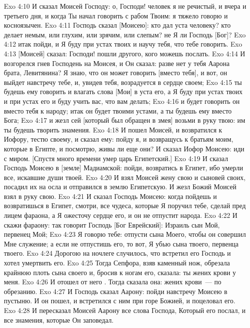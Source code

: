 \rsbpar\vs Exo 4:10 И сказал Моисей Господу: о, Господи! человек я не речистый,  и вчера и третьего дня, и когда Ты начал говорить с рабом Твоим: я тяжело говорю и косноязычен.
\vs Exo 4:11 Господь сказал [Моисею]: кто дал уста человеку? кто делает немым, или глухим, или зрячим, или слепым? не Я ли Господь [Бог]?
\vs Exo 4:12 итак пойди, и Я буду при устах твоих и научу тебя, что тебе говорить.
\vs Exo 4:13 [Моисей] сказал: Господи! пошли другого, кого можешь послать.
\vs Exo 4:14 И возгорелся гнев Господень на Моисея, и Он сказал: разве нет у тебя Аарона брата, Левитянина? Я знаю, что он может говорить [вместо тебя], и вот, он выйдет навстречу тебе, и, увидев тебя, возрадуется в сердце своем;
\vs Exo 4:15 ты будешь ему говорить и влагать слова [Мои] в уста его, а Я буду при устах твоих и при устах его и буду учить вас, что вам делать;
\vs Exo 4:16 и будет говорить он вместо тебя к народу; итак он будет твоими устами, а ты будешь ему вместо Бога;
\vs Exo 4:17 и жезл сей [который был обращен в змея] возьми в руку твою: им ты будешь творить знамения.
\rsbpar\vs Exo 4:18 И пошел Моисей, и возвратился к Иофору, тестю своему, и сказал ему: пойду я, и возвращусь к братьям моим, которые в Египте, и посмотрю, живы ли еще они? И сказал Иофор Моисею: иди с миром. [Спустя много времени умер царь Египетский.]
\rsbpar\vs Exo 4:19 И сказал Господь Моисею в [земле] Мадиамской: пойди, возвратись в Египет, ибо умерли все, искавшие души твоей.
\vs Exo 4:20 И взял Моисей жену свою и сыновей своих, посадил их на осла и отправился в землю Египетскую. И жезл Божий Моисей взял в руку свою.
\vs Exo 4:21 И сказал Господь Моисею: когда пойдешь и возвратишься в Египет, смотри, все чудеса, которые Я поручил тебе, сделай пред лицем фараона, а Я ожесточу сердце его, и он не отпустит народа.
\vs Exo 4:22 И скажи фараону: так говорит Господь [Бог Еврейский]: Израиль  сын Мой, первенец Мой;
\vs Exo 4:23 Я говорю тебе: отпусти сына Моего, чтобы он совершил Мне служение; а если не отпустишь его, то вот, Я убью сына твоего, первенца твоего.
\rsbpar\vs Exo 4:24 Дорогою на ночлеге случилось, что встретил его Господь и хотел умертвить его.
\vs Exo 4:25 Тогда Сепфора, взяв каменный нож, обрезала крайнюю плоть сына своего и, бросив к ногам его, сказала: ты жених крови у меня.
\vs Exo 4:26 И отошел от него . Тогда сказала она: жених крови~--- по обрезанию.
\rsbpar\vs Exo 4:27 И Господь сказал Аарону: пойди навстречу Моисею в пустыню. И он пошел, и встретился с ним при горе Божией, и поцеловал его.
\vs Exo 4:28 И пересказал Моисей Аарону все слова Господа, Который его послал, и все знамения, которые Он заповедал.
